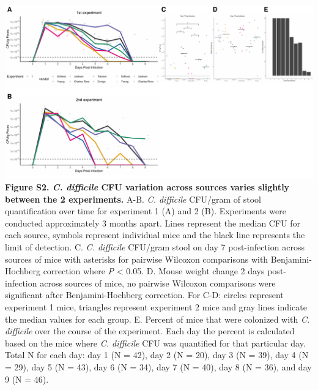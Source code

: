 \documentclass[11pt,]{article}
\begin{document}
\newpage

\includegraphics{figure_S2.pdf} \textbf{Figure S2. \emph{C. difficile}
CFU variation across sources varies slightly between the 2 experiments.}
A-B. \emph{C. difficile} CFU/gram of stool quantification over time for
experiment 1 (A) and 2 (B). Experiments were conducted approximately 3
months apart. Lines represent the median CFU for each source, symbols
represent individual mice and the black line represents the limit of
detection. C. \emph{C. difficile} CFU/gram stool on day 7 post-infection
across sources of mice with asterisks for pairwise Wilcoxon comparisons
with Benjamini-Hochberg correction where \emph{P} \textless{} 0.05. D.
Mouse weight change 2 days post-infection across sources of mice, no
pairwise Wilcoxon comparisons were significant after Benjamini-Hochberg
correction. For C-D: circles represent experiment 1 mice, triangles
represent experiment 2 mice and gray lines indicate the median values
for each group. E. Percent of mice that were colonized with \emph{C.
difficile} over the course of the experiment. Each day the percent is
calculated based on the mice where \emph{C. difficile} CFU was
quantified for that particular day. Total N for each day: day 1 (N =
42), day 2 (N = 20), day 3 (N = 39), day 4 (N = 29), day 5 (N = 43), day
6 (N = 34), day 7 (N = 40), day 8 (N = 36), and day 9 (N = 46).

\newpage
\end{document}
